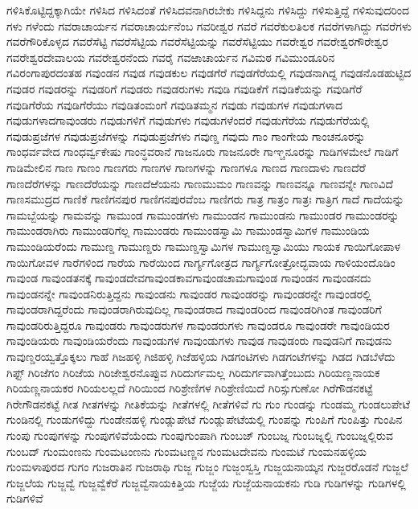{ಗಳಿಸಿಕೊಟ್ಟಿದ್ದಕ್ಕಾಗಿಯೇ
ಗಳಿಸಿದ
ಗಳಿಸಿದಂತೆ
ಗಳಿಸಿದವನಾಗಿರಬೇಕು
ಗಳಿಸಿದ್ದನು
ಗಳಿಸಿದ್ದು
ಗಳಿಸುತ್ತಿದ್ದೆ
ಗಳಿಸುವುದರಿಂದ
ಗಳು
ಗಳೆಂದು
ಗವರಾಚಾರ್ಯನ
ಗವರಾಚಾರ್ಯನೆಂಬ
ಗವರೀಶ್ವರ
ಗವರೆ
ಗವರೆಕುಲತಿಲಕ
ಗವರೆಗಳಾಗಿದ್ದು
ಗವರೆಗಳು
ಗವರೆಗೌರಿಕೊಳ್ಳದ
ಗವರೆಸೆಟ್ಟಿ
ಗವರೆಸೆಟ್ಟಿಯ
ಗವರೆಸೆಟ್ಟಿಯನ್ನು
ಗವರೆಸೆಟ್ಟಿಯು
ಗವರೇಶ್ವರ
ಗವರೇಶ್ವರಗೌರೇಶ್ವರ
ಗವರೇಶ್ವರದೇವಾಲಯ
ಗವರೇಶ್ವರನೆಂದು
ಗವರೈ
ಗವಱಾಚಾರ್ಯನ
ಗವಿಮಠ
ಗವಿಮುಂಡೂರಿನ
ಗವಿರಂಗಾಪುರದಂತಹ
ಗವುಂಡನ
ಗವುಡ
ಗವುಡಕುಲ
ಗವುಡಗೆರೆ
ಗವುಡಗೆರೆಯಲ್ಲಿ
ಗವುಡನಾಗಿದ್ದ
ಗವುಡನೊಡಹುಟ್ಟಿದ
ಗವುಡರ
ಗವುಡರನ್ನು
ಗವುಡರಿಗೆ
ಗವುಡರು
ಗವುಡರುಗಳು
ಗವುಡಿ
ಗವುಡಿಕೆಗೆ
ಗವುಡಿಕೆಯನ್ನು
ಗವುಡಿಗೆರೆ
ಗವುಡಿಗೆರೆಯ
ಗವುಡಿಗೆರೆಯು
ಗವುಡಿತಂಮಂಗೆ
ಗವುಡಿತಮ್ಮನ
ಗವುಡು
ಗವುಡುಗಳ
ಗವುಡುಗಳಾದ
ಗವುಡುಗಳಾದಗಾವುಂಡರು
ಗವುಡುಗಳಿಗೆ
ಗವುಡುಗಳು
ಗವುಡುಗಳೆಂದರೆ
ಗವುಡುಗೆರೆಯ
ಗವುಡುಗೆರೆಯಲ್ಲಿ
ಗವುಡುಪ್ರಜೆಗಳ
ಗವುಡುಪ್ರಜೆಗಳನ್ನು
ಗವುಡುಪ್ರಜೆಗಳು
ಗವುಣ್ಡ
ಗವುದು
ಗಾಂ
ಗಾಂಗೇಯ
ಗಾಂಚನೂರನ್ನು
ಗಾಂಧರ್ವವೇದ
ಗಾಂಧರ್ವ್ವಕೇಷು
ಗಾಂನ್ಧವರಾನೆ
ಗಾಜನೂರು
ಗಾಜನೂರೇ
ಗಾಞ್ಚನೂರನ್ನು
ಗಾಡಿಗಳಮೇಲೆ
ಗಾಡಿಗೆ
ಗಾಡಿಮೇಲಿನ
ಗಾಣ
ಗಾಣಂ
ಗಾಣಗರು
ಗಾಣಗಳ
ಗಾಣಗಳನ್ನು
ಗಾಣಗಳೂ
ಗಾಣದ
ಗಾಣದಾಳು
ಗಾಣದೆರೆ
ಗಾಣದೆರೆಗಳನ್ನು
ಗಾಣದೆರೆಯನ್ನು
ಗಾಣದೆಱೆಯನು
ಗಾಣಮುಮಂ
ಗಾಣವನ್ನು
ಗಾಣವನ್ನೂ
ಗಾಣವನ್ನೇ
ಗಾಣವಿದೆ
ಗಾಣಸಮುದ್ರದ
ಗಾಣಿಕೆ
ಗಾಣಿಗನಪುರ
ಗಾಣಿಗನಪುರವೆಂಬ
ಗಾಣಿಗರು
ಗಾತ್ರ
ಗಾತ್ರಂ
ಗಾತ್ರಃ
ಗಾತ್ರಿಗ
ಗಾದೆ
ಗಾದೆಯನ್ನು
ಗಾಮಬ್ಬೆಯನ್ನು
ಗಾಮವನ್ನು
ಗಾಮುಂಡ
ಗಾಮುಂಡಗಳು
ಗಾಮುಂಡನ
ಗಾಮುಂಡನು
ಗಾಮುಂಡರ
ಗಾಮುಂಡರನ್ನು
ಗಾಮುಂಡರಾಗಿರು
ಗಾಮುಂಡರಿಗೆಲ್ಲ
ಗಾಮುಂಡರು
ಗಾಮುಂಡಸ್ವಾಮಿ
ಗಾಮುಂಡಸ್ವಾಮಿಗಳ
ಗಾಮುಂಡಿಯ
ಗಾಮುಂಡಿಯರೆಂದು
ಗಾಮುಣ್ಡ
ಗಾಮುಣ್ಡರು
ಗಾಮುಣ್ಡಸ್ವಾಮಿಗಳ
ಗಾಮುಣ್ಡಸ್ವಾಮಿಯು
ಗಾಯಕ
ಗಾಯಿಗೋಪಾಳ
ಗಾಯಿಗೋವಳ
ಗಾರೆಗಳಿಂದ
ಗಾರೆಯ
ಗಾರೆಯಿಂದ
ಗಾರ್ಗ್ಯಗೋತ್ರದ
ಗಾರ್ಗ್ಯಗೋತ್ರೋದ್ಭವಾಯ
ಗಾಳಿಯಂದೊಡಿಂ
ಗಾವುಂಡ
ಗಾವುಂಡತನಕ್ಕೆ
ಗಾವುಂಡದೇವಗಾವುಂಡಕಾವಗಾವುಂಡಚಾಮಗಾವುಂಡ
ಗಾವುಂಡನ
ಗಾವುಂಡನದು
ಗಾವುಂಡನನ್ನೇ
ಗಾವುಂಡನಿರುತ್ತಿದ್ದನು
ಗಾವುಂಡನು
ಗಾವುಂಡರ
ಗಾವುಂಡರನ್ನು
ಗಾವುಂಡರನ್ನೇ
ಗಾವುಂಡರಲ್ಲಿ
ಗಾವುಂಡರಾಗಿದ್ದರೆಂದು
ಗಾವುಂಡರಾಗಿರುವುದಿಲ್ಲ
ಗಾವುಂಡರಾದ
ಗಾವುಂಡರಿಂದ
ಗಾವುಂಡರಿಗಿಂತ
ಗಾವುಂಡರಿಗೆ
ಗಾವುಂಡರಿರುತ್ತಿದ್ದರೂ
ಗಾವುಂಡರು
ಗಾವುಂಡರುಗಳ
ಗಾವುಂಡರುಗಳು
ಗಾವುಂಡರೂ
ಗಾವುಂಡರೇ
ಗಾವುಂಡಿಯರ
ಗಾವುಂಡಿಯರು
ಗಾವುಂಡಿಯರೆಂದು
ಗಾವುಂಡುಗಳ
ಗಾವುಂಡುಗಳು
ಗಾವುಡ
ಗಾವುಡಂರು
ಗಾವುಡನಿಗೆ
ಗಾವುಡನು
ಗಾವುಣ್ಡರಯ್ವತ್ತೊಕ್ಕಲು
ಗಾಹೆ
ಗಿಜಹಳ್ಳಿ
ಗಿಜಿಹಳ್ಳಿ
ಗಿಜೆಹಳ್ಳಿಯ
ಗಿಡಗಂಟಿಗಳು
ಗಿಡಗಂಟೆಗಳನ್ನು
ಗಿಡದ
ಗಿಡಬೆಳೆದು
ಗಿಫ್ಟ್
ಗಿರಿಜೆಗಂ
ಗಿರಿಜೆಯ
ಗಿರಿಜೇಶ್ವರನೊಪ್ಪುವ
ಗಿರಿದುರ್ಗಮಲ್ಲ
ಗಿರಿದುರ್ಗವಾಗಿತ್ತೆಂಬುದು
ಗಿರಿಯಣ್ಣನಾಯಕ
ಗಿರಿಯಣ್ಣನಾಯಕರ
ಗಿರಿಯಲಲ್ಲದೆ
ಗಿರಿಯಿಂದ
ಗಿರಿಶ್ರೇಣಿಗಳ
ಗಿರಿಶ್ರೇಣಿಯಿದೆ
ಗಿರಿಸ್ಸುಗುಣೋ
ಗಿರೆಗೌಡನಕಟ್ಟೆ
ಗಿರೇಗೌಡನಕಟ್ಟೆ
ಗೀತ
ಗೀತಗಳನ್ನು
ಗೀತಿಕೆಯನ್ನು
ಗೀತೆಗಳಲ್ಲಿ
ಗೀತೆಗಳಿವೆ
ಗು
ಗುಂ
ಗುಂಡನ್ನು
ಗುಂಡಮ್ಮ
ಗುಂಡಲುಪೇಟೆ
ಗುಂಡಿನಲ್ಲಿ
ಗುಂಡುಗಳಿದ್ದು
ಗುಂಡೇನಹಳ್ಳಿ
ಗುಂಡ್ಲುಪೇಟೆ
ಗುಂಡ್ಲುಪೇಟೆಯಲ್ಲಿ
ಗುಂಪನ್ನು
ಗುಂಪಿಗೆ
ಗುಂಪಿತ್ತು
ಗುಂಪಿನ
ಗುಂಪು
ಗುಂಪುಗಳನ್ನು
ಗುಂಪುಗಳಿವೆಯೆಂದು
ಗುಂಪುಗುಂಪಾಗಿ
ಗುಂಬಜ್
ಗುಂಬಜ್ನ
ಗುಂಬಜ್ನಲ್ಲಿ
ಗುಂಬಜ್ನಲ್ಲಿರುವ
ಗುಂಬದ್
ಗುಂಮಂಣನು
ಗುಂಮಟಂಣನು
ಗುಂಮಟಣ್ಣನ
ಗುಂಮಟದೇವನು
ಗುಂಮಟೆ
ಗುಂಮನಹಳ್ಳಿಯ
ಗುಂಮಳಾಪುರದ
ಗುಗಂ
ಗುಜರಾತಿನ
ಗುಜರಾಥಿ
ಗುಜ್ಜ
ಗುಜ್ಜಂ
ಗುಜ್ಜಂಸ್ವಸ್ತಿ
ಗುಜ್ಜಯನಾಯ್ಕನ
ಗುಜ್ಜರರೊಡನೆ
ಗುಜ್ಜಲೆ
ಗುಜ್ಜಲೆಯ
ಗುಜ್ಜವ್ವೆ
ಗುಜ್ಜವ್ವೆಕೆರೆ
ಗುಜ್ಜವ್ವೆನಾಯಕಿತ್ತಿಯ
ಗುಜ್ಜೆಯ
ಗುಜ್ಜೆಯನಾಯಕನು
ಗುಡಿ
ಗುಡಿಗಳನ್ನು
ಗುಡಿಗಳಲ್ಲಿ
ಗುಡಿಗಳಿವೆ
}
